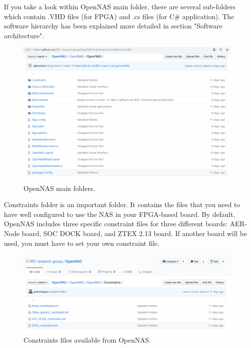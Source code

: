If you take a look within OpenNAS main folder, there are several sub-folders which contain .VHD files (for FPGA) and .cs files (for C\# application). The software hierarchy has been explained more detailed in section "Software architecture".

\begin{figure}[H]
\centering
\includegraphics[width=1\textwidth]{images/Img04_OpenNAS_Project_Folders.PNG}
\caption{\label{fig:OpenNAS_folders}OpenNAS main folders.}
\end{figure}

Constraints folder is an important folder. It contains the files that you need to have well configured to use the NAS in your FPGA-based board. By default, OpenNAS includes three specific constraint files for three different boards: AER-Node board, SOC DOCK board, and ZTEX 2.13 board. If another board will be used, you must have to set your own constraint file. 

\begin{figure}[H]
\centering
\includegraphics[width=1\textwidth]{images/Img05_Constraints.PNG}
\caption{\label{fig:OpenNAS_Constraints}Constraints files available from OpenNAS.}
\end{figure}

